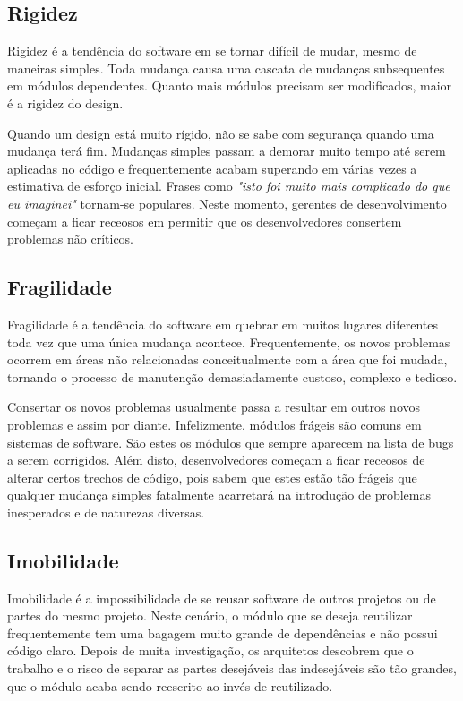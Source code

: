 \subsection{Rigidez}
\label{subsec:rigidez}

Rigidez é a tendência do software em se tornar difícil de mudar, mesmo de 
maneiras simples. Toda mudança causa uma cascata de mudanças subsequentes  em
módulos dependentes. Quanto mais módulos precisam ser modificados, maior é a
rigidez do design. 

Quando um design está muito rígido, não se sabe com segurança quando uma 
mudança terá fim. Mudanças simples passam a demorar muito tempo até serem 
aplicadas no código e frequentemente acabam superando em várias vezes a 
estimativa de esforço inicial. 
Frases como \textit{"isto foi muito mais complicado do que eu imaginei"} 
tornam-se populares. Neste momento, gerentes de desenvolvimento começam a ficar
receosos em permitir que os desenvolvedores consertem problemas não críticos.

\subsection{Fragilidade}
\label{subsec:fragilidade}

Fragilidade é a tendência do software em quebrar em muitos lugares diferentes 
toda vez que uma única mudança acontece. Frequentemente, os novos problemas
ocorrem  em áreas não relacionadas conceitualmente com a área que foi mudada, 
tornando o processo de manutenção demasiadamente custoso, complexo e tedioso. 

Consertar os novos problemas usualmente passa a resultar em outros novos
problemas e assim por diante. Infelizmente, módulos frágeis são comuns em
sistemas de software. São estes os módulos que sempre aparecem na lista de bugs
a serem corrigidos. 
Além disto, desenvolvedores começam a ficar receosos de alterar certos trechos 
de código, pois sabem que estes estão tão frágeis que qualquer mudança simples 
fatalmente acarretará na introdução de problemas inesperados e de naturezas
diversas.

\subsection{Imobilidade}

Imobilidade é a impossibilidade de se reusar software de outros projetos ou de
partes do mesmo projeto. Neste cenário, o módulo que se deseja reutilizar 
frequentemente tem uma bagagem muito grande de dependências e não possui código 
claro. 
Depois de muita investigação, os arquitetos descobrem que o trabalho e o risco 
de separar as partes desejáveis das indesejáveis são tão grandes, que o módulo 
acaba sendo reescrito ao invés de reutilizado.


